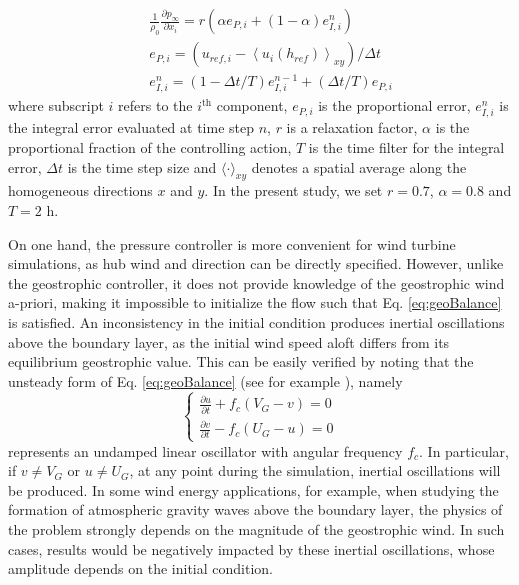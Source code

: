 \documentclass[journal abbreviation, manuscript]{copernicus}
\begin{document}
\begin{eqnarray}
	&&\frac{1}{\rho_0}\frac{\partial p_\infty}{\partial x_i} = r\left(\alpha  e_{P,i} + (1-\alpha) e^n_{I,i}\right) \label{eq:pControl_1}\\
	&& e_{P,i} =\left(u_{ref,i} - \left\langle u_i(h_{ref})\right\rangle_{xy}\right)\big/\Delta t \label{eq:pControl_2} \\
	&& e^n_{I,i} = (1 - \Delta t / T) e^{n-1}_{I,i} + (\Delta t / T) e_{P,i}  \label{eq:pControl_3}
\end{eqnarray}
where subscript $i$ refers to the $i^{\text{th}}$ component, $e_{P,i}$ is the proportional error, $e^n_{I,i}$ is the integral error evaluated at time step $n$, $r$ is a relaxation factor, $\alpha$ is the proportional fraction of the controlling action, $T$ is the time filter for the integral error, $\Delta t$ is the time step size and $\langle\cdot\rangle_{xy}$ denotes a spatial average along the homogeneous directions $x$ and $y$. In the present study, we set $r=0.7$, $\alpha=0.8$ and $T=2$ h. 

On one hand, the pressure controller is more convenient for wind turbine simulations, as hub wind and direction can be directly specified. However, unlike the geostrophic controller, it does not provide knowledge of the geostrophic wind a-priori, making it impossible to initialize the flow such that Eq. \ref{eq:geoBalance} is satisfied. An inconsistency in the initial condition produces inertial oscillations above the boundary layer, as the initial wind speed aloft differs from its equilibrium geostrophic value. This can be easily verified by noting that the unsteady form of Eq. \ref{eq:geoBalance} (see for example \citealp{2016_Stull}), namely
\begin{equation}
	\begin{cases}
	 \frac{\partial u}{\partial t} + f_c(V_G - v) = 0  \\
	 \frac{\partial v}{\partial t} - f_c(U_G -u) = 0
	\end{cases} 
	 \label{eq:geoBalanceUnsteady}
\end{equation}
represents an undamped linear oscillator with angular frequency $f_c$. In particular, if $v\neq V_G$ or $u\neq U_G$, at any point during the simulation, inertial oscillations will be produced. In some wind energy applications, for example, when studying the formation of atmospheric gravity waves above the boundary layer, the physics of the problem strongly depends on the magnitude of the geostrophic wind. In such cases, results would be negatively impacted by these inertial oscillations, whose amplitude depends on the initial condition.
\end{document}
